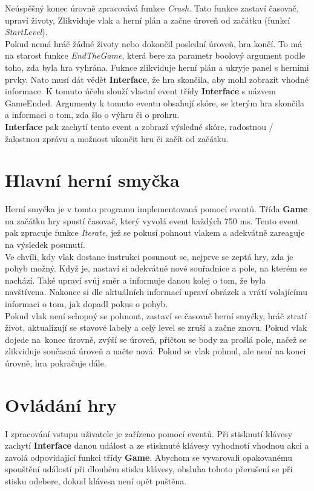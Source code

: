 \documentclass[11pt,a4paper]{scrreprt}
\begin{document}
Neúspěšný konec úrovně zpracovává funkce \textit{Crash}. Tato funkce zastaví časovač, upraví životy, Zlikviduje vlak a herní plán a začne úroveň od začátku (funkcí \textit{StartLevel}).\\

Pokud nemá hráč žádné životy nebo dokončil poslední úroveň, hra končí. To má na starost funkce \textit{EndTheGame}, která bere za parametr boolový argument podle toho, zda byla hra vyhrána. Fuknce zlikviduje herní plán a ukryje panel s herními prvky. Nato musí dát vědět \textbf{Interface}, že hra skončila, aby mohl zobrazit vhodné informace. K tomuto účelu slouží vlastní event třídy \textbf{Interface} s názvem GameEnded. Argumenty k tomuto eventu obsahují skóre, se kterým hra skončila a informaci o tom, zda šlo o výhru či o prohru. \\

\textbf{Interface} pak zachytí tento event a zobrazí výsledné skóre, radostnou / žalostnou zprávu a možnost ukončit hru či začít od začátku.

\section{Hlavní herní smyčka}
Herní smyčka je v tomto programu implementovaná pomocí eventů. Třída \textbf{Game} na začátku hry spustí časovač, který vyvolá event každých 750 ms. Tento event pak zpracuje funkce \textit{Iterate}, jež se pokusí pohnout vlakem a adekvátně zareaguje na výsledek posunutí.\\

Ve chvíli, kdy vlak dostane instrukci posunout se, nejprve se zeptá hry, zda je pohyb možný. Když je, nastaví si adekvátně nové souřadnice a pole, na kterém se nachází. Také upraví svůj směr a informuje danou kolej o tom, že byla navštívena. Nakonec si dle aktuálních informací upraví obrázek a vrátí volajícímu informaci o tom, jak dopadl pokus o pohyb.\\

Pokud vlak není schopný se pohnout, zastaví se časovač herní smyčky, hráč ztratí život, aktualizují se stavové labely a celý level se zruší a začne znovu. Pokud vlak dojede na~konec úrovně, zvýší se úroveň, přičtou se body za prošlá pole, načež se zlikviduje současná úroveň a načte nová. Pokud se vlak pohnul, ale není na konci úrovně, hra pokračuje dále.



\section{Ovládání hry}
I zpracování vstupu uživatele je zařízeno pomocí eventů. Při stisknutí klávesy zachytí \textbf{Interface} danou událost a ze stisknuté klávesy vyhodnotí vhodnou akci a zavolá odpovídající funkci třídy \textbf{Game}. Abychom se vyvarovali opakovanému spouštění událostí při dlouhém stisku klávesy, obsluha tohoto přerušení se při stisku odebere, dokud klávesa není opět puštěna.
\end{document}
